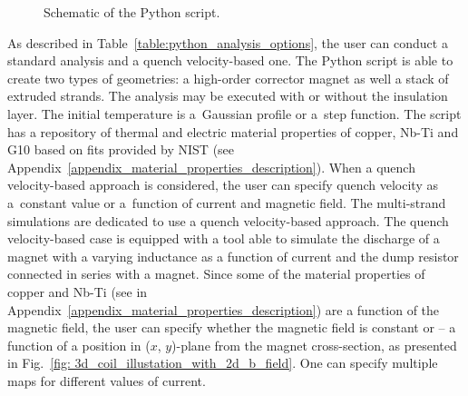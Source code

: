 \begin{figure}[H]
    \caption{Schematic of the Python script.}
    \label{fig:block_diagram_python_architecture}
\end{figure}

As described in Table~\ref{table:python_analysis_options}, the user can conduct a standard analysis and a quench velocity-based one. The Python script is able to create two types of geometries: a high-order corrector magnet as well a stack of extruded strands. The analysis may be executed with or without the insulation layer. The initial temperature is a~Gaussian profile or a~step function. The script has a repository of thermal and electric material properties of copper, Nb-Ti and G10 based on fits provided by NIST (see Appendix~\ref{appendix_material_properties_description}). When a quench velocity-based approach is considered, the user can specify quench velocity as a~constant value or a~function of current and magnetic field. The multi-strand simulations are dedicated to use a quench velocity-based approach. The quench velocity-based case is equipped with a tool able to simulate the discharge of a magnet with a varying inductance as a function of current and the dump resistor connected in series with a magnet. Since some of the material properties of copper and Nb-Ti (see in Appendix~\ref{appendix_material_properties_description}) are a function of the magnetic field, the user can specify whether the magnetic field is constant or -- a function of a position in ($x$, $y$)-plane from the magnet cross-section, as presented in Fig.~\ref{fig: 3d_coil_illustation_with_2d_b_field}. One can specify multiple maps for different values of current.

